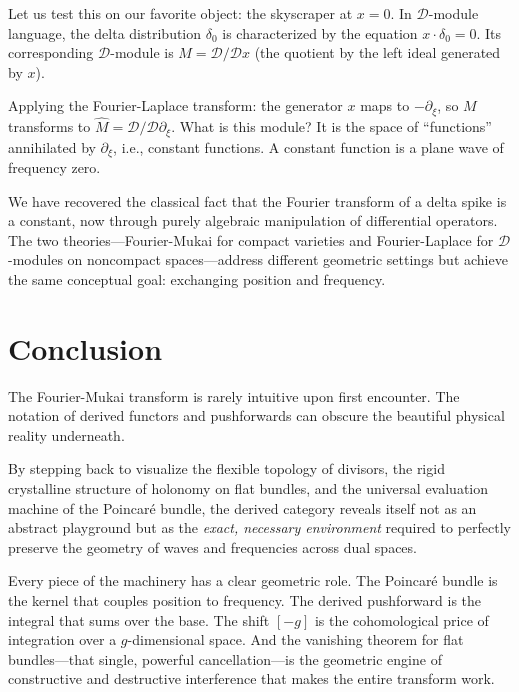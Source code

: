 \documentclass{article}
\newcommand{\CD}{{\mathcal{D}}}
\begin{document}
Let us test this on our favorite object: the skyscraper at $x = 0$. In $\CD$-module language, the delta distribution $\delta_0$ is characterized by the equation $x \cdot \delta_0 = 0$. Its corresponding $\CD$-module is $M = \CD / \CD x$ (the quotient by the left ideal generated by $x$).

Applying the Fourier-Laplace transform: the generator $x$ maps to $-\partial_\xi$, so $M$ transforms to $\hat{M} = \CD / \CD \partial_\xi$. What is this module? It is the space of ``functions'' annihilated by $\partial_\xi$, i.e., constant functions. A constant function is a plane wave of frequency zero.

We have recovered the classical fact that the Fourier transform of a delta spike is a constant, now through purely algebraic manipulation of differential operators. The two theories---Fourier-Mukai for compact varieties and Fourier-Laplace for $\CD$-modules on noncompact spaces---address different geometric settings but achieve the same conceptual goal: exchanging position and frequency.

\section*{Conclusion}

The Fourier-Mukai transform is rarely intuitive upon first encounter. The notation of derived functors and pushforwards can obscure the beautiful physical reality underneath.

By stepping back to visualize the flexible topology of divisors, the rigid crystalline structure of holonomy on flat bundles, and the universal evaluation machine of the Poincar\'{e} bundle, the derived category reveals itself not as an abstract playground but as the \emph{exact, necessary environment} required to perfectly preserve the geometry of waves and frequencies across dual spaces.

Every piece of the machinery has a clear geometric role. The Poincar\'{e} bundle is the kernel that couples position to frequency. The derived pushforward is the integral that sums over the base. The shift $[-g]$ is the cohomological price of integration over a $g$-dimensional space. And the vanishing theorem for flat bundles---that single, powerful cancellation---is the geometric engine of constructive and destructive interference that makes the entire transform work.
\end{document}
